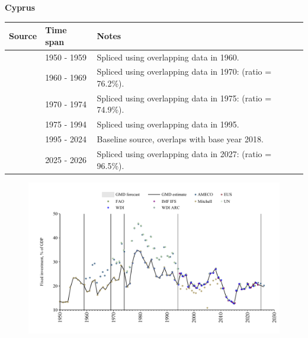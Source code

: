 \documentclass[12pt,a4paper,landscape]{article}
\begin{document}
\begin{adjustbox}{max totalsize={\paperwidth}{\paperheight},center}
\begin{minipage}[t][\textheight][t]{\textwidth}
\vspace*{0.5cm}
{}
\begin{center}
{\Large\bfseries Cyprus}
\end{center}
\vspace{0.5cm}
\begin{table}[H]
\centering
\small
\begin{tabular}{|l|l|l|}
\hline
\textbf{Source} & \textbf{Time span} & \textbf{Notes} \\
\hline
\rowcolor{white}\cite{Mitchell}& 1950 - 1959 &Spliced using overlapping data in 1960.\\
\rowcolor{lightgray}\cite{AMECO}& 1960 - 1969 &Spliced using overlapping data in 1970: (ratio = 76.2\%).\\
\rowcolor{white}\cite{UN}& 1970 - 1974 &Spliced using overlapping data in 1975: (ratio = 74.9\%).\\
\rowcolor{lightgray}\cite{WDI}& 1975 - 1994 &Spliced using overlapping data in 1995.\\
\rowcolor{white}\cite{EUS}& 1995 - 2024 &Baseline source, overlaps with base year 2018.\\
\rowcolor{lightgray}\cite{AMECO}& 2025 - 2026 &Spliced using overlapping data in 2027: (ratio = 96.5\%).\\
\hline
\end{tabular}
\end{table}
\begin{figure}[H]
\centering
\includegraphics[width=\textwidth,height=0.6\textheight,keepaspectratio]{graphs/CYP_finv_GDP.pdf}
\end{figure}
\end{minipage}
\end{adjustbox}
\end{document}
